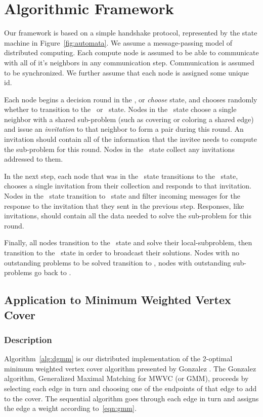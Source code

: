 \documentclass[conference, 10pt, letter]{IEEEtran}
\begin{document}
\section{Algorithmic Framework}
\label{sec:framework}
Our framework is based on a simple handshake protocol, represented by the state machine in Figure~\ref{fig:automata}. We assume a message-passing model of distributed computing. Each compute node is assumed to be able to communicate with all of it's neighbors in any communication step. Communication is assumed to be synchronized. We further assume that each node is assigned some unique id.



Each node begins a decision round in the \cCd, or {\em choose} state, and chooses randomly whether to transition to the \cId\ or \cLd\ state. Nodes in the \cId\ state choose a single neighbor with a shared sub-problem (such as covering or coloring a shared edge) and issue an {\em invitation} to that neighbor to form a pair during this round. An invitation should contain all of the information that the invitee needs to compute the sub-problem for this round. Nodes in the \cLd\ state collect any invitations addressed to them. 

In the next step, each node that was in the \cLd\ state transitions to the \cRd\ state, chooses a single invitation from their collection and responds to that invitation. Nodes in the \cId\ state transition to \cWd\ state and filter incoming messages for the response to the invitation that they sent in the previous step. Responses, like invitations, should contain all the data needed to solve the sub-problem for this round. 

Finally, all nodes transition to the \cUd\ state and solve their local-subproblem, then transition to the \cEd\ state in order to broadcast their solutions. Nodes with no outstanding problems to be solved transition to \cDd, nodes with outstanding sub-problems go back to \cCd.

\subsection{Application to Minimum Weighted Vertex Cover}
\label{sub:algorithms-dgmm}
\subsubsection{Description}
\label{ssb:algorithms-dgmm-description}

Algorithm~\ref{alg:dgmm} is our distributed implementation of the 2-optimal minimum weighted vertex cover algorithm presented by Gonzalez \cite{Gonzalez1995129}. The Gonzalez algorithm, Generalized Maximal Matching for MWVC (or GMM), proceeds by selecting each edge in turn and choosing one of the endpoints of that edge to add to the cover. The sequential algorithm goes through each edge in turn and assigns the edge a weight according to~\eqref{eqn:gmm}.
\end{document}
